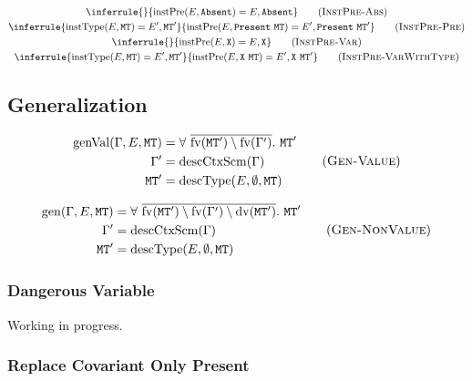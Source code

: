 \documentclass{report}
\newcommand{\code}{\mathtt}
\newcommand{\ruleTag}[1]{\label{#1}\tag{\textsc{#1}}}
\DeclareMathOperator{\describeContextScheme}{descCtxScm}
\DeclareMathOperator{\describeType}{descType}
\DeclareMathOperator{\instantiateType}{instType}
\DeclareMathOperator{\instantiatePresence}{instPre}
\DeclareMathOperator{\generalizeValue}{genVal}
\DeclareMathOperator{\generalize}{gen}
\DeclareMathOperator{\freeVariable}{fv}
\DeclareMathOperator{\dangerousVariable}{dv}
\begin{document}
\begin{gather}
\inferrule
{}
{\instantiatePresence(E, \code{Absent}) = E, \code{Absent}}
\ruleTag{InstPre-Abs}
\\
\inferrule
{\instantiateType(E, \code{MT}) = E', \code{MT}'}
{\instantiatePresence(E, \code{Present}\ \code{MT}) = E', \code{Present}\ \code{MT}'}
\ruleTag{InstPre-Pre}
\\
\inferrule
{}
{\instantiatePresence(E, \code{X}) = E, \code{X}}
\ruleTag{InstPre-Var}
\\
\inferrule
{\instantiateType(E, \code{MT}) = E', \code{MT}'}
{\instantiatePresence(E, \code{X}\ \code{MT}) = E', \code{X}\ \code{MT}'}
\ruleTag{InstPre-VarWithType}
\end{gather}

\subsection{Generalization}

\begin{equation}
\begin{split}
\generalizeValue(\Gamma, E, \code{MT}) & = \forall\ \overline{\freeVariable(\code{MT}') \setminus \freeVariable(\Gamma')}.\ \code{MT}' \\
\Gamma' & = \describeContextScheme(\Gamma) \\
\code{MT}' & = \describeType(E, \emptyset, \code{MT})
\end{split}
\ruleTag{Gen-Value}
\end{equation}

\begin{equation}
\begin{split}
\generalize(\Gamma, E, \code{MT}) & = \forall\ \overline{\freeVariable(\code{MT}') \setminus \freeVariable(\Gamma') \setminus \dangerousVariable(\code{MT}')}.\ \code{MT}' \\
\Gamma' & = \describeContextScheme(\Gamma) \\
\code{MT}' & = \describeType(E, \emptyset, \code{MT})
\end{split}
\ruleTag{Gen-NonValue}
\end{equation}

\subsubsection{Dangerous Variable}

Working in progress.

\subsubsection{Replace Covariant Only Present}
\end{document}
